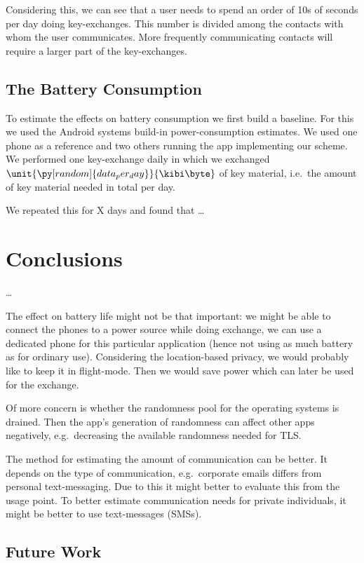 Considering this, we can see that a user needs to spend an order of 10s of 
seconds per day doing key-exchanges.
This number is divided among the contacts with whom the user communicates.
More frequently communicating contacts will require a larger part of the 
key-exchanges.

\subsection{The Battery Consumption}
\label{sec:Battery}
To estimate the effects on battery consumption we first build a baseline.
For this we used the Android systems build-in power-consumption estimates.
We used one phone as a reference and two others running the app implementing 
our scheme.
We performed one key-exchange daily in which we exchanged 
\(\unit{\py[random]{data_per_day}}{\kibi\byte}\) of key material, i.e.~the 
amount of key material needed in total per day.

We repeated this for X days and found that \dots


\section{Conclusions}
\label{sec:Conclusions}

\dots

The effect on battery life might not be that important: we might be able to 
connect the phones to a power source while doing exchange, we can use 
a dedicated phone for this particular application (hence not using as much 
battery as for ordinary use).
Considering the location-based privacy, we would probably like to keep it in 
flight-mode.
Then we would save power which can later be used for the exchange.

Of more concern is whether the randomness pool for the operating systems is 
drained.
Then the app's generation of randomness can affect other apps negatively, 
e.g.~decreasing the available randomness needed for TLS\@.

The method for estimating the amount of communication can be better.
It depends on the type of communication, e.g.~corporate emails differs from 
personal text-messaging.
Due to this it might better to evaluate this from the usage point.
To better estimate communication needs for private individuals, it might be 
better to use text-messages (SMSs).

\subsection{Future Work}


